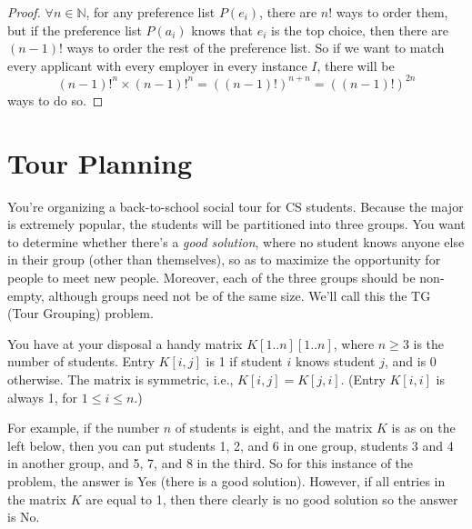 \documentclass[11pt,fleqn]{exam}
\newenvironment{soln}{\color{solnblue}}{}
\begin{document}
\begin{questions}
\begin{soln}
	\begin{proof}
		$\forall n \in \mathbb{N}$, for any preference list $P(e_i)$,
		there are $n!$ ways to order them, but if the preference list $P(a_i)$ knows that $e_i$ is the top choice,
		then there are $(n-1)!$ ways to order the rest of the preference list.
		So if we want to match every applicant with every employer in every instance $I$, there will be
		\[ {(n-1)!}^n \times {(n-1)!}^n = {((n-1)!)}^{n + n} = {((n-1)!)}^{2n} \]
		ways to do so.
	\end{proof}
\end{soln}


\fi
\end{questions}

\clearpage

\section{Tour Planning}

You're organizing a back-to-school social tour for CS students. Because the major is extremely popular, the students will be partitioned into three groups. You want to determine whether there's a {\em good solution}, where no student knows anyone else in their group (other than themselves), so as to maximize the opportunity for people to meet new people. Moreover, each of the three groups should be non-empty, although groups need not be of the same size. We'll call this the TG (Tour Grouping) problem.

You have at your disposal a handy matrix $K[1..n][1..n]$, where $n\ge 3$ is the number of students. Entry $K[i,j]$ is 1 if student $i$ knows student $j$, and is 0 otherwise. The matrix is symmetric, i.e., $K[i,j] = K[j,i]$. (Entry $K[i,i]$ is always 1, for $1 \le i \le n$.)

For example, if the number $n$ of students is eight, and the matrix $K$ is as on the left below, then you can put students 1, 2, and 6 in one group, students 3 and 4 in another group, and 5, 7, and 8 in the third. So for this instance of the problem, the answer is Yes (there is a good solution). However, if all entries in the matrix $K$ are equal to 1, then there clearly is no good solution so the answer is No.
\end{document}
